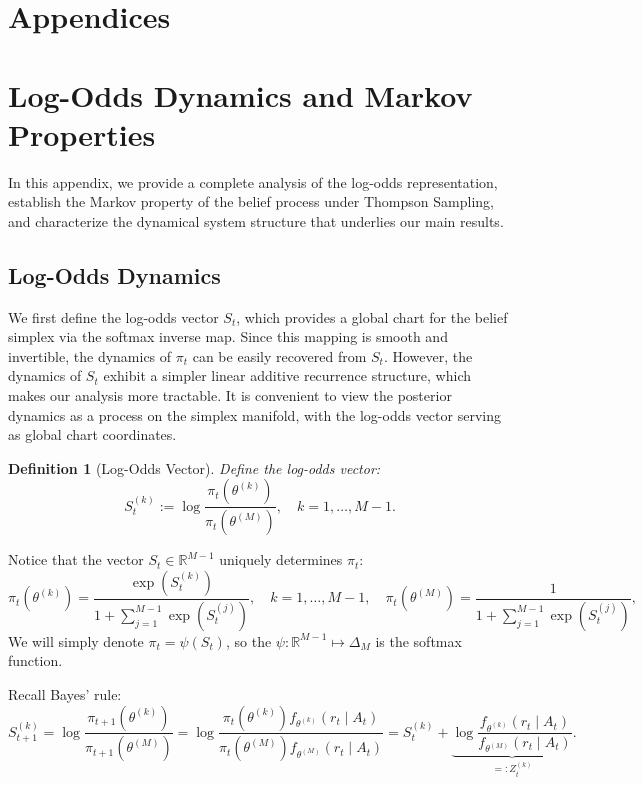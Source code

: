 \documentclass[12pt]{article}
\newtheorem{definition}{Definition}
\begin{document}
\newpage

\appendix
\renewcommand{\thesection}{\Alph{section}}

\section*{Appendices}

\section{Log-Odds Dynamics and Markov Properties}
\label{app:A}

In this appendix, we provide a complete analysis of the log-odds representation, establish the Markov property of the belief process under Thompson Sampling, and characterize the dynamical system structure that underlies our main results.

\subsection{Log-Odds Dynamics}
\label{app:A:logodds-dynamics}
We first define the log-odds vector $S_t$, which provides a global chart for the belief simplex via the softmax inverse map. Since this mapping is smooth and invertible, the dynamics of $\pi_t$ can be easily recovered from $S_t$. However, the dynamics of $S_t$ exhibit a simpler linear additive recurrence structure, which makes our analysis more tractable. It is convenient to view the posterior dynamics as a process on the simplex manifold, with the log-odds vector serving as global chart coordinates.

\begin{definition}[Log-Odds Vector]
Define the log-odds vector:
\[
S_t^{(k)} := \log\frac{\pi_t(\theta^{(k)})}{\pi_t(\theta^{(M)})},
\quad k=1,\ldots,M-1.
\]
\end{definition}

Notice that the vector $S_t\in \mathbb{R}^{M-1}$ uniquely determines $\pi_t$:
\begin{equation}
\pi_t(\theta^{(k)}) = \frac{\exp(S_t^{(k)})}{1 + \sum_{j=1}^{M-1}\exp(S_t^{(j)})}, \quad k=1,\ldots,M-1,
\quad
\pi_t(\theta^{(M)}) = \frac{1}{1 + \sum_{j=1}^{M-1}\exp(S_t^{(j)})},
\label{eq:pi_S}
\end{equation}
We will simply denote $\pi_t = \psi(S_t)$, so the $\psi : \mathbb{R}^{M-1} \mapsto \Delta_M$ is the softmax function.

Recall Bayes' rule:
\[
S_{t+1}^{(k)} = \log\frac{\pi_{t+1}(\theta^{(k)})}{\pi_{t+1}(\theta^{(M)})}
= \log\frac{\pi_t(\theta^{(k)}) f_{\theta^{(k)}}(r_t\mid A_t)}{\pi_t(\theta^{(M)}) f_{\theta^{(M)}}(r_t\mid A_t)}
= S_t^{(k)} + \underbrace{\log\frac{f_{\theta^{(k)}}(r_t\mid A_t)}{f_{\theta^{(M)}}(r_t\mid A_t)}}_{=:Z_t^{(k)}}.
\]
\end{document}
